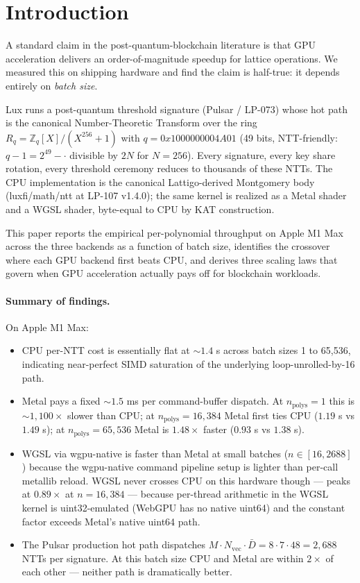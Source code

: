 \section{Introduction}
\label{sec:intro}

A standard claim in the post-quantum-blockchain literature is that
GPU acceleration delivers an order-of-magnitude speedup for lattice
operations. We measured this on shipping hardware and find the claim
is half-true: it depends entirely on \emph{batch size}.

Lux runs a post-quantum threshold signature (Pulsar / LP-073) whose
hot path is the canonical Number-Theoretic Transform over the ring
$R_q = \mathbb{Z}_q[X]/(X^{256}+1)$ with $q = 0x1000000004A01$
(49 bits, NTT-friendly: $q - 1 = 2^{49} - \cdot$ divisible by $2N$
for $N = 256$). Every signature, every key share rotation, every
threshold ceremony reduces to thousands of these NTTs. The CPU
implementation is the canonical Lattigo-derived Montgomery body
(luxfi/math/ntt at LP-107 v1.4.0); the same kernel is realized as
a Metal shader and a WGSL shader, byte-equal to CPU by KAT
construction.

This paper reports the empirical per-polynomial throughput on
Apple M1 Max across the three backends as a function of batch size,
identifies the crossover where each GPU backend first beats CPU,
and derives three scaling laws that govern when GPU acceleration
actually pays off for blockchain workloads.

\paragraph{Summary of findings.}
On Apple M1 Max:
\begin{itemize}
\item CPU per-NTT cost is essentially flat at $\sim 1.4$ \textmu s
across batch sizes 1 to 65{,}536, indicating near-perfect SIMD
saturation of the underlying loop-unrolled-by-16 path.
\item Metal pays a fixed $\sim 1.5$ ms per command-buffer dispatch.
At $n_\text{polys} = 1$ this is $\sim 1{,}100\times$ slower than CPU;
at $n_\text{polys} = 16{,}384$ Metal first ties CPU
($1.19$ \textmu s vs $1.49$ \textmu s); at $n_\text{polys} = 65{,}536$
Metal is $1.48\times$ faster ($0.93$ \textmu s vs $1.38$ \textmu s).
\item WGSL via wgpu-native is faster than Metal at small batches
($n \in [16, 2688]$) because the wgpu-native command pipeline
setup is lighter than per-call metallib reload. WGSL never crosses
CPU on this hardware though — peaks at $0.89\times$ at
$n = 16{,}384$ — because per-thread arithmetic in the WGSL kernel
is uint32-emulated (WebGPU has no native uint64) and the constant
factor exceeds Metal's native uint64 path.
\item The Pulsar production hot path dispatches $M \cdot N_\text{vec}
\cdot \bar{D} = 8 \cdot 7 \cdot 48 = 2{,}688$ NTTs per signature. At
this batch size CPU and Metal are within $2\times$ of each other —
neither path is dramatically better.
\end{itemize}

